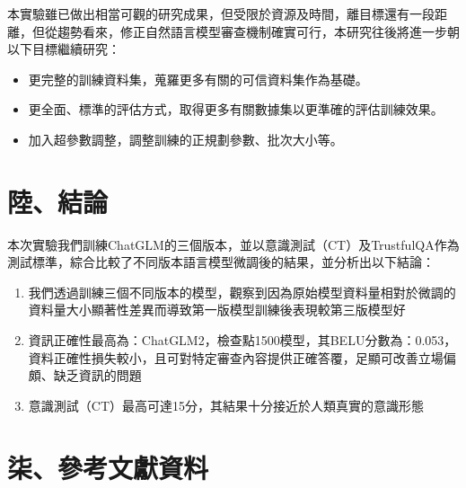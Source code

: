 \documentclass[12pt,a4paper,MingLiU,UTF8,natbib]{article}
\begin{document}
	本實驗雖已做出相當可觀的研究成果，但受限於資源及時間，離目標還有一段距離，但從趨勢看來，修正自然語言模型審查機制確實可行，本研究往後將進一步朝以下目標繼續研究：
	
	\begin{itemize}
		\item 更完整的訓練資料集，蒐羅更多有關的可信資料集作為基礎。
		\item 更全面、標準的評估方式，取得更多有關數據集以更準確的評估訓練效果。
		\item 加入超參數調整，調整訓練的正規劃參數、批次大小等。
	\end{itemize}

	\section{陸、結論}
	本次實驗我們訓練ChatGLM的三個版本，並以意識測試（CT）及TrustfulQA作為測試標準，綜合比較了不同版本語言模型微調後的結果，並分析出以下結論：
		\begin{enumerate}
			\item 我們透過訓練三個不同版本的模型，觀察到因為原始模型資料量相對於微調的資料量大小顯著性差異而導致第一版模型訓練後表現較第三版模型好
			\item 資訊正確性最高為：ChatGLM2，檢查點1500模型，其BELU分數為：0.053，資料正確性損失較小，且可對特定審查內容提供正確答覆，足顯可改善立場偏頗、缺乏資訊的問題
			\item 意識測試（CT）最高可達15分，其結果十分接近於人類真實的意識形態
		\end{enumerate}
	\section{柒、參考文獻資料}
	
	\renewcommand{\refname}{}
	
\end{document}
